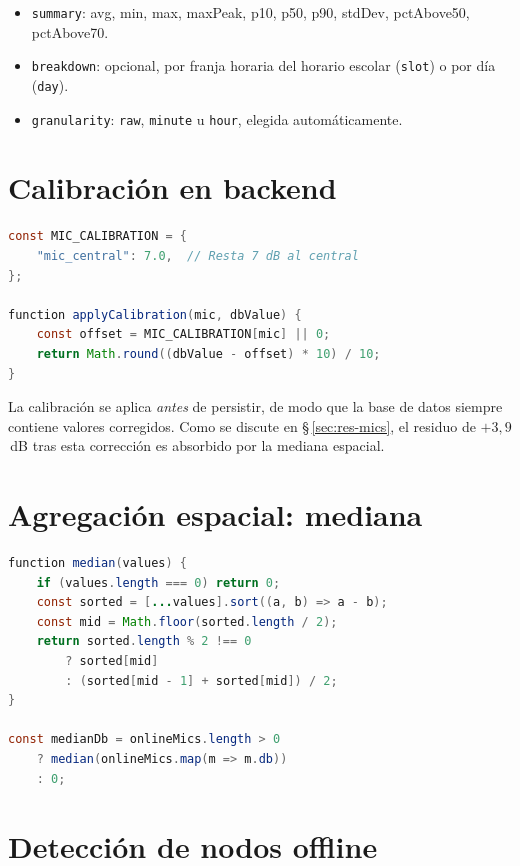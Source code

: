 \documentclass[11pt,a4paper,openany]{report}
\begin{document}
\begin{itemize}
    \item \texttt{summary}: avg, min, max, maxPeak, p10, p50, p90, stdDev, pctAbove50, pctAbove70.
    \item \texttt{breakdown}: opcional, por franja horaria del horario escolar (\texttt{slot}) o por d\'ia (\texttt{day}).
    \item \texttt{granularity}: \texttt{raw}, \texttt{minute} u \texttt{hour}, elegida autom\'aticamente.
\end{itemize}

\section{Calibraci\'on en backend}

\begin{lstlisting}[language=Java, caption={Calibraci\'on aplicada en la ingesta MQTT (backend/src/index.js)}]
const MIC_CALIBRATION = {
    "mic_central": 7.0,  // Resta 7 dB al central
};

function applyCalibration(mic, dbValue) {
    const offset = MIC_CALIBRATION[mic] || 0;
    return Math.round((dbValue - offset) * 10) / 10;
}
\end{lstlisting}

La calibraci\'on se aplica \emph{antes} de persistir, de modo que la base de datos siempre contiene valores corregidos. Como se discute en \S\,\ref{sec:res-mics}, el residuo de $+3{,}9$\,dB tras esta correcci\'on es absorbido por la mediana espacial.

\section{Agregaci\'on espacial: mediana}

\begin{lstlisting}[language=Java, caption={C\'alculo de mediana para agregaci\'on del aula}]
function median(values) {
    if (values.length === 0) return 0;
    const sorted = [...values].sort((a, b) => a - b);
    const mid = Math.floor(sorted.length / 2);
    return sorted.length % 2 !== 0
        ? sorted[mid]
        : (sorted[mid - 1] + sorted[mid]) / 2;
}

const medianDb = onlineMics.length > 0
    ? median(onlineMics.map(m => m.db))
    : 0;
\end{lstlisting}

\section{Detecci\'on de nodos offline}
\end{document}
